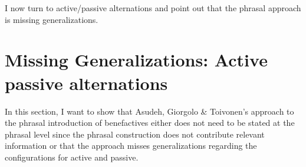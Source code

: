 
I now turn to active/passive alternations and point out that the phrasal approach is missing generalizations.

\chapter{Missing Generalizations: Active passive alternations}
\label{sec-missing-generalization-internal}
\label{sec-active-passive}


In this section, I want to show that Asudeh, Giorgolo \& Toivonen's approach to the phrasal introduction
of benefactives either does not need to be stated at the phrasal level since the phrasal
construction does not contribute relevant information or that the approach misses generalizations
regarding the configurations for active and passive.

